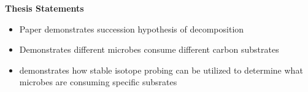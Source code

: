 \textbf{Thesis Statements}
\begin{itemize}
\item Paper demonstrates succession hypothesis of decomposition
\item Demonstrates different microbes consume different carbon substrates
\item demonstrates how stable isotope probing can be utilized to determine what microbes are consuming specific subsrates
\end{itemize}


